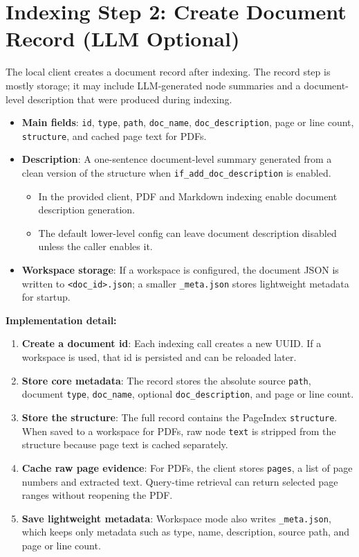 \documentclass[11pt,a4paper]{article}
\newcommand{\fieldname}[1]{\textcolor{red!70!black}{\texttt{#1}}}
\begin{document}
\section{Indexing Step 2: Create Document Record (LLM Optional)}

The local client creates a document record after indexing. The record step is mostly storage; it may include LLM-generated node summaries and a document-level description that were produced during indexing.

\begin{itemize}
    \item \textbf{Main fields}: \fieldname{id}, \fieldname{type}, \fieldname{path}, \fieldname{doc\_name}, \fieldname{doc\_description}, page or line count, \fieldname{structure}, and cached page text for PDFs.
    \item \textbf{Description}: A one-sentence document-level summary generated from a clean version of the structure when \fieldname{if\_add\_doc\_description} is enabled.
    \begin{itemize}
        \item In the provided client, PDF and Markdown indexing enable document description generation.
        \item The default lower-level config can leave document description disabled unless the caller enables it.
    \end{itemize}
    \item \textbf{Workspace storage}: If a workspace is configured, the document JSON is written to \texttt{<doc\_id>.json}; a smaller \texttt{\_meta.json} stores lightweight metadata for startup.
\end{itemize}

\noindent\textbf{Implementation detail:}
\begin{enumerate}
    \item \textbf{Create a document id}: Each indexing call creates a new UUID. If a workspace is used, that id is persisted and can be reloaded later.
    \item \textbf{Store core metadata}: The record stores the absolute source \fieldname{path}, document \fieldname{type}, \fieldname{doc\_name}, optional \fieldname{doc\_description}, and page or line count.
    \item \textbf{Store the structure}: The full record contains the PageIndex \fieldname{structure}. When saved to a workspace for PDFs, raw node \fieldname{text} is stripped from the structure because page text is cached separately.
    \item \textbf{Cache raw page evidence}: For PDFs, the client stores \fieldname{pages}, a list of page numbers and extracted text. Query-time retrieval can return selected page ranges without reopening the PDF.
    \item \textbf{Save lightweight metadata}: Workspace mode also writes \texttt{\_meta.json}, which keeps only metadata such as type, name, description, source path, and page or line count.
\end{enumerate}
\end{document}
